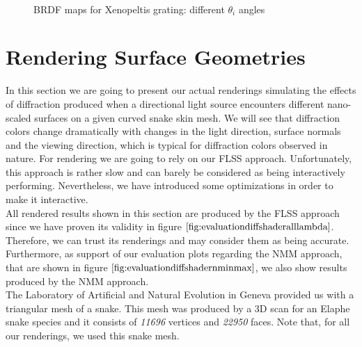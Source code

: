 \begin{figure}[H]
  \centering
~
~
  
\caption[BRDF Map: Varying Viewing Angles]{BRDF maps for Xenopeltis grating: different $\theta_i$ angles}
\label{fig:brdfmapsxenodiffthetaiangles}
\end{figure}

\section{Rendering Surface Geometries}
\label{sec:snakegeomrenderings}
In this section we are going to present our actual renderings simulating the effects of diffraction produced when a directional light source encounters different nano-scaled surfaces on a given curved snake skin mesh. We will see that diffraction colors change dramatically with changes in the light direction, surface normals and the viewing direction, which is typical for diffraction colors observed in nature. For rendering we are going to rely on our FLSS approach. Unfortunately, this approach is rather slow and can barely be considered as being interactively performing. Nevertheless, we have introduced some optimizations in order to make it interactive. \\

All rendered results shown in this section are produced by the FLSS approach since we have proven its validity in figure $\ref{fig:evaluationdiffshaderalllambda}$. Therefore, we can trust its renderings and may consider them as being accurate. Furthermore, as support of our evaluation plots regarding the NMM approach, that are shown in figure $\ref{fig:evaluationdiffshadernminmax}$, we also show results produced by the NMM approach. \\

The Laboratory of Artificial and Natural Evolution in Geneva provided us with a triangular mesh of a snake. This mesh was produced by a 3D scan for an Elaphe snake species and it consists of \emph{11696} vertices and \emph{22950} faces. Note that, for all our renderings, we used this snake mesh. \\


